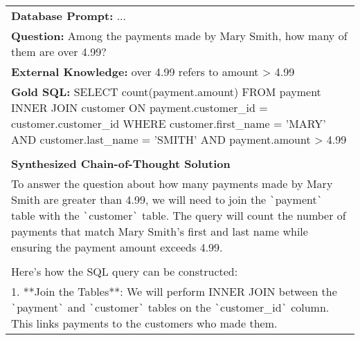 \begin{table*}[htbp]
\centering
\begin{tcolorbox}[
    colback=white, %
    colframe=black, %
    title=Response, %
    fonttitle=\bfseries, %
    width=\textwidth, %
    boxrule=1pt, %
    rounded corners, %
]

\begin{tabularx}{\textwidth}{X}
\textbf{Database Prompt:} ... \\
\textbf{Question:} Among the payments made by Mary Smith, how many of them are over 4.99?\\ 
\textbf{External Knowledge:} over 4.99 refers to amount > 4.99 \\
\textbf{Gold SQL:} SELECT count(payment.amount) FROM payment INNER JOIN customer ON payment.customer\_id = customer.customer\_id WHERE customer.first\_name = 'MARY' AND customer.last\_name = 'SMITH' AND payment.amount > 4.99 \\
\hline
\\ \textbf{Synthesized Chain-of-Thought Solution} \\

To answer the question about how many payments made by Mary Smith are greater than 4.99, we will need to join the \verb|`|payment\verb|`| table with the \verb|`|customer\verb|`| table. The query will count the number of payments that match Mary Smith's first and last name while ensuring the payment amount exceeds 4.99.
\\ \\
Here’s how the SQL query can be constructed:
\\
1. **Join the Tables**: We will perform INNER JOIN between the \verb|`|payment\verb|`| and \verb|`|customer\verb|`| tables on the \verb|`|customer\_id\verb|`| column. This links payments to the customers who made them.


\end{tabularx}
\end{tcolorbox}
\end{table*}
